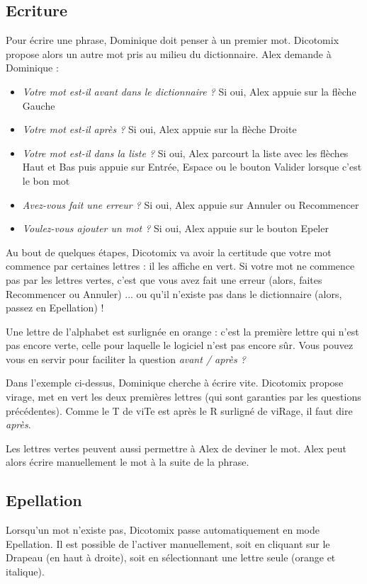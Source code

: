 \documentclass[french]{article}
\newcommand\image[2][.4]{\begin{center}\frame{\texttt{[image: images/\#2]}}\end{center}}
\begin{document}
\subsection{Ecriture}
Pour écrire une phrase, Dominique doit penser à un premier mot. Dicotomix propose alors un autre mot pris au milieu du dictionnaire. Alex demande à Dominique :
\begin{itemize}
	\item \emph{Votre mot est-il avant dans le dictionnaire ?} Si oui, Alex appuie sur la flèche Gauche
	\item \emph{Votre mot est-il après ?} Si oui, Alex appuie sur la flèche Droite
	\item \emph{Votre mot est-il dans la liste ?} Si oui, Alex parcourt la liste avec les flèches Haut et Bas puis appuie sur Entrée, Espace ou le bouton Valider lorsque c'est le bon mot
	\item \emph{Avez-vous fait une erreur ?} Si oui, Alex appuie sur Annuler ou Recommencer
	\item \emph{Voulez-vous ajouter un mot ?} Si oui, Alex appuie sur le bouton Epeler
\end{itemize}

\image{boutons.png}

Au bout de quelques étapes, Dicotomix va avoir la certitude que votre mot commence par certaines lettres : il les affiche en vert. Si votre mot ne commence pas par les lettres vertes, c'est que vous avez fait une erreur (alors, faites Recommencer ou Annuler) ... ou qu'il n'existe pas dans le dictionnaire (alors, passez en Epellation) !

Une lettre de l'alphabet est surlignée en orange : c'est la première lettre qui n'est pas encore verte, celle pour laquelle le logiciel n'est pas encore sûr. Vous pouvez vous en servir pour faciliter la question \emph{avant / après ?}  

\image{prefix.png}

Dans l'exemple ci-dessus, Dominique cherche à écrire \og vite\fg{}. Dicotomix propose \og virage\fg{}, met en vert les deux premières lettres (qui sont garanties par les questions précédentes). Comme le T de \og viTe\fg{} est après le R surligné de \og viRage\fg{}, il faut dire \emph{après}.

Les lettres vertes peuvent aussi permettre à Alex de deviner le mot. Alex peut alors écrire manuellement le mot à la suite de la phrase.

\subsection{Epellation}
Lorsqu'un mot n'existe pas, Dicotomix passe automatiquement en mode Epellation. Il est possible de l'activer manuellement, soit en cliquant sur le Drapeau (en haut à droite), soit en sélectionnant une lettre seule (orange et italique).
\image{activeSpell-small.png}
\end{document}
